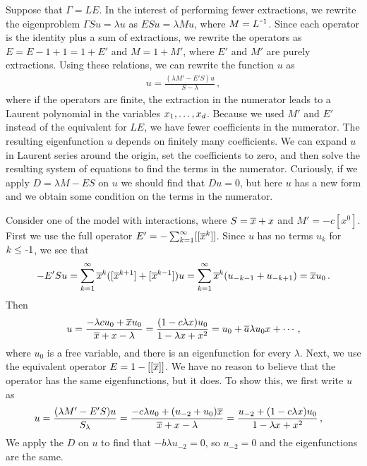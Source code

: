 Suppose that $\Gamma = LE$. In the interest of performing fewer extractions, we rewrite the eigenproblem $\Gamma S u = \lambda u$ as $ESu = \lambda M u$, where $M = L^{\um 1}$. Since each operator is the identity plus a sum of extractions, we rewrite the operators as $E = E-1 +1 = 1 + E'$ and $M = 1 + M'$, where $E'$ and $M'$ are purely extractions. Using these relations, we can rewrite the function $u$ as
\begin{align}
	u = \frac{(\lambda M' - E'S)u}{S-\lambda}\,,
\end{align}
where if the operators are finite, the extraction in the numerator leads to a Laurent polynomial in the variables $x_1,\ldots, x_d$. Because we used $M'$ and $E'$ instead of the equivalent for $LE$, we have fewer coefficients in the numerator. The resulting eigenfunction $u$ depends on finitely many coefficients. We can expand $u$ in Laurent series around the origin, set the coefficients to zero, and then solve the resulting system of equations to find the terms in the numerator. Curiously, if we apply $D = \lambda M - ES$ on $u$ we should find that $Du = 0$, but here $u$ has a new form and we obtain some condition on the terms in the numerator.

\begin{exa} Consider one of the \classic \oneD model with interactions, where $S = \overline{x} + x$ and $M' = -c[x^0]$. First we use the full  operator $E' = - \sum_{k=1}^\infty [[\overline{x}^k]]$. Since $u$ has no terms $u_k$ for $k\leq \um 1$, we see that
\begin{align}
	-E'Su = \sum_{k=1}^\infty \overline{x}^k ([\overline{x}^{k+1}]+[\overline{x}^{k-1}])u = \sum_{k=1}^\infty \overline{x}^k (u_{-k-1} + u_{-k+1}) = \overline{x} u_0\,.
\end{align}
Then
\begin{align}
	u = \frac{-\lambda c u_0 +\overline{x} u_0}{\overline{x} + x - \lambda} = \frac{(1-c\lambda x)u_0}{1- \lambda x +x^2} = u_0 + \overline{a}\lambda u_0 x + \cdots\,,
\end{align}
where $u_0$ is a free variable, and there is an eigenfunction for every $\lambda$. Next, we use the equivalent operator $E = 1 - [[\overline{x}]]$. We have no reason to believe that the operator has  the same eigenfunctions, but it does. To show this, we first write $u$ as
\begin{align}
	u = \frac{(\lambda M' - E'S) u}{S_\lambda} &= \frac{-c\lambda u_0 + (u_{-2}+u_0)\overline{x}}{\overline{x} + x - \lambda} = \frac{u_{-2} + (1 - c \lambda x)u_0}{1-\lambda x  + x^2}\,,
\end{align}
We apply the $D$ on $u$ to find that $-b\lambda u_{-2} = 0$, so $u_{-2} = 0$ and the eigenfunctions are the same.
\end{exa}


